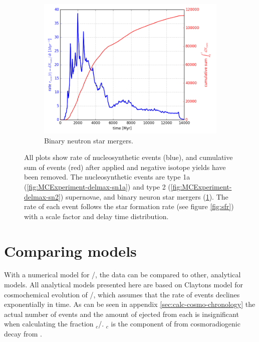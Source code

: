 \begin{figure}
\begin{subfigure}{\figwidth}
    \includegraphics[width=\linewidth]{results/MCExperiment_revised_2_delmax/nsm.png}
    \caption{ \label{fig:MCExperiment-delmax-nsm}
      Binary neutron star mergers.
    }
  \end{subfigure}
  \caption[Rate of nucleosynthetic events]{ \label{fig:MCExperiment-delmax-rate}
    All plots show rate of nucleosynthetic events (blue), and cumulative sum of events (red)
    after \betadecay applied and negative isotope yields have been removed.
    The nucleosynthetic events are type 1a (\ref{fig:MCExperiment-delmax-sn1a}) and type 2 (\ref{fig:MCExperiment-delmax-sn2})
    supernovae, and binary neuron star mergers (\ref{fig:MCExperiment-delmax-nsm}).
    The rate of each event follows the star formation rate (see figure \ref{fig:sfr}) with a scale factor and delay time distribution.
  } 
\end{figure}
\FloatBarrier %

\section{Comparing models}
With a numerical model for /, the data can be compared to other, analytical models.
All analytical models presented here are based on Claytons model for cosmochemical evolution of /,
which assumes that the rate of events declines exponentially in time.
As can be seen in appendix \ref{sec:calc-cosmo-chronology} the actual number of events and the amount of  ejected from each is insignificant when calculating the fraction $_c$/. $_c$ is the component of  from cosmoradiogenic decay from .

